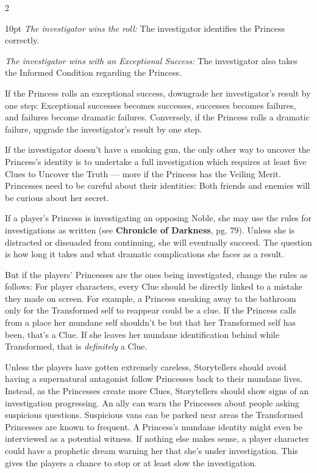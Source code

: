 \begin{multicols}{2}
\begin{myindentpar}{10pt}
    \emph{The investigator wins the roll:} The investigator identifies the Princess correctly.
    
    \emph{The investigator wins with an Exceptional Success:} The investigator also takes the Informed Condition regarding the Princess. 
\end{myindentpar}

If the Princess rolls an exceptional success, downgrade her investigator's result by one step: Exceptional successes becomes successes, successes becomes failures, and failures become dramatic failures. Conversely, if the Princess rolls a dramatic failure, upgrade the investigator's result by one step.

If the investigator doesn't have a smoking gun, the only other way to uncover the Princess's identity is to undertake a full investigation which requires at least five Clues to Uncover the Truth — more if the Princess has the Veiling Merit. Princesses need to be careful about their identities: Both friends and enemies will be curious about her secret. 

If a player's Princess is investigating an opposing Noble, she may use the rules for investigations as written (see \textbf{Chronicle of Darkness}, pg. 79). Unless she is distracted or dissuaded from continuing, she will eventually succeed. The question is how long it takes and what dramatic complications she faces as a result. 

But if the players' Princesses are the ones being investigated, change the rules as follows: For player characters, every Clue should be directly linked to a mistake they made on screen. For example, a Princess sneaking away to the bathroom only for the Transformed self to reappear could be a clue. If the Princess calls from a place her mundane self shouldn't be but that her Transformed self has been, that's a Clue. If she leaves her mundane identification behind while Transformed, that is \textit{definitely} a Clue.

Unless the players have gotten extremely careless, Storytellers should avoid having a supernatural antagonist follow Princesses back to their mundane lives. Instead, as the Princesses create more Clues, Storytellers should show signs of an investigation progressing. An ally can warn the Princesses about people asking suspicious questions. Suspicious vans can be parked near areas the Transformed Princesses are known to frequent. A Princess's mundane identity might even be interviewed as a potential witness. If nothing else makes sense, a player character could have a prophetic dream warning her that she's under investigation. This gives the players a chance to stop or at least slow the investigation.  


\end{multicols}
